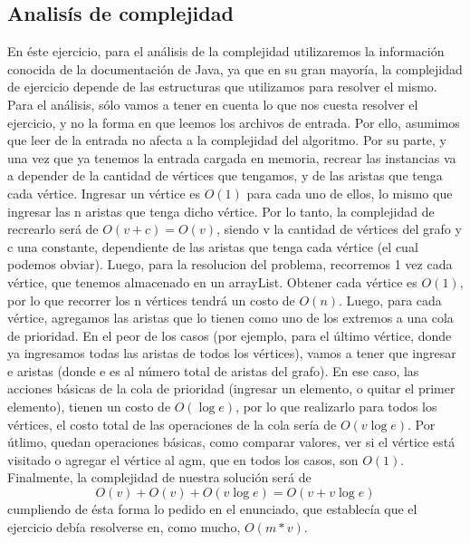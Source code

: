 \subsection{Analisís de complejidad}	
En éste ejercicio, para el análisis de la complejidad utilizaremos la información conocida de la documentación de Java, ya que en su gran mayoría, la complejidad de ejercicio depende de las estructuras que utilizamos para resolver el mismo.
Para el análisis, sólo vamos a tener en cuenta lo que nos cuesta resolver el ejercicio, y no la forma en que leemos los archivos de entrada. Por ello, asumimos que leer de la entrada no afecta a la complejidad del algoritmo. Por su parte, y una vez que ya tenemos la entrada cargada en memoria, recrear las instancias va a depender de la cantidad de vértices que tengamos, y de las aristas que tenga cada vértice. Ingresar un vértice es $O(1)$ para cada uno de ellos, lo mismo que ingresar las n aristas que tenga dicho vértice. Por lo tanto, la complejidad de recrearlo será de $O(v + c) = O(v)$, siendo v la cantidad de vértices del grafo y c una constante, dependiente de las aristas que tenga cada vértice (el cual podemos obviar).
Luego, para la resolucion del problema, recorremos 1 vez cada vértice, que tenemos almacenado en un arrayList. Obtener cada vértice es $O(1)$, por lo que recorrer los n vértices tendrá un costo de $O(n)$. 
Luego, para cada vértice, agregamos las aristas que lo tienen como uno de los extremos a una cola de prioridad. En el peor de los casos (por ejemplo, para el último vértice, donde ya ingresamos todas las aristas de todos los vértices), vamos a tener que ingresar e aristas (donde e es al número total de aristas del grafo). En ese caso, las acciones básicas de la cola de prioridad (ingresar un elemento, o quitar el primer elemento), tienen un costo de $O(\log e)$, por lo que realizarlo para todos los vértices, el costo total de las operaciones de la cola sería de $O(v \log e)$.
Por útlimo, quedan operaciones básicas, como comparar valores, ver si el vértice está visitado o agregar el vértice al agm, que en todos los casos, son $O(1)$.
Finalmente, la complejidad de nuestra solución será de \[O(v) + O(v) + O(v \log e) = O(v + v \log e)\] cumpliendo de ésta forma lo pedido en el enunciado, que establecía que el ejercicio debía resolverse en, como mucho, $O(m*v)$.
